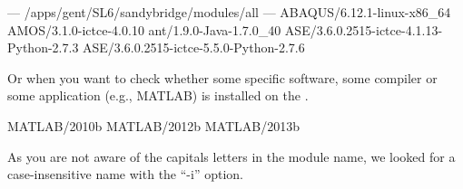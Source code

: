 \begin{prompt}
--- /apps/gent/SL6/sandybridge/modules/all ---
ABAQUS/6.12.1-linux-x86_64
AMOS/3.1.0-ictce-4.0.10
ant/1.9.0-Java-1.7.0_40
ASE/3.6.0.2515-ictce-4.1.13-Python-2.7.3
ASE/3.6.0.2515-ictce-5.5.0-Python-2.7.6
\end{prompt}

Or when you want to check whether some specific software, some compiler or some
application (e.g., MATLAB) is installed on the \hpc.

\begin{prompt}
MATLAB/2010b
MATLAB/2012b
MATLAB/2013b
\end{prompt}

As you are not aware of the capitals letters in the module name, we looked for
a case-insensitive name with the ``-i'' option.
